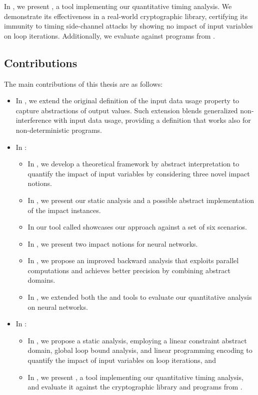 In , we present \timesec\sidenote{\timesecurl}, a tool implementing our quantitative timing analysis.
We demonstrate its effectiveness in a real-world cryptographic library, certifying its immunity to timing side-channel attacks by showing no impact of input variables on loop iterations.
Additionally, we evaluate \timesec{} against programs from \svcomp.

\subsection{Contributions}

The main contributions of this thesis are as follows:
\begin{itemize}
  \item In , we extend the original definition of the input data usage property to capture abstractions of output values.
  Such extension blends generalized non-interference with input data usage, providing a definition that works also for non-deterministic programs.
  \item In :
    \begin{itemize}
      \item In , we develop a theoretical framework by abstract interpretation to quantify the impact of input variables by considering three novel impact notions.
      \item In , we present our static analysis and a possible abstract implementation of the impact instances.
      \item In  our tool called \impatto\sidenote{\impattourl} showcases our approach against a set of six scenarios.
      \item In , we present two impact notions for neural networks.
      \item In , we propose an improved backward analysis that exploits parallel computations and achieves better precision by combining abstract domains.
      \item In , we extended both the \impatto{} and \libra{} tools to evaluate our quantitative analysis on neural networks.
    \end{itemize}
  \item In :
    \begin{itemize}
      \item In , we propose a static analysis, employing a linear constraint abstract domain, global loop bound analysis, and linear programming encoding to quantify the impact of input variables on loop iterations, and
      \item In , we present \timesec\sidenote{\timesecurl}, a tool implementing our quantitative timing analysis, and evaluate it against the \bignum{} cryptographic library\sidenote{\bignumurl} and programs from \svcomp \sidenote{\svcompurl}.
    \end{itemize}
\end{itemize}
